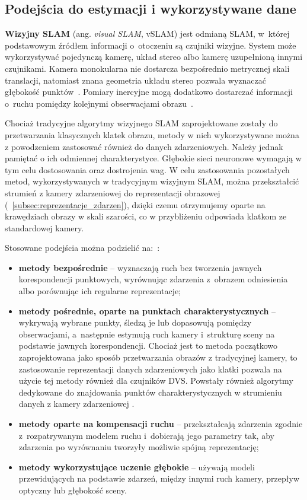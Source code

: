 \subsection{Podejścia do estymacji i wykorzystywane dane}
\label{subsec:podejscia_estymacja}

\textbf{Wizyjny SLAM} (ang. \textit{visual SLAM}, vSLAM) jest odmianą SLAM, w~której podstawowym źródłem informacji o~otoczeniu są czujniki wizyjne. System może wykorzystywać pojedynczą kamerę, układ stereo albo kamerę uzupełnioną innymi czujnikami. Kamera monokularna nie dostarcza bezpośrednio metrycznej skali translacji, natomiast znana geometria układu stereo pozwala wyznaczać głębokość punktów~\cite{hartley2004multiple}. Pomiary inercyjne mogą dodatkowo dostarczać informacji o~ruchu pomiędzy kolejnymi obserwacjami obrazu~\cite{forster2015preintegration}.

Chociaż tradycyjne algorytmy wizyjnego SLAM zaprojektowane zostały do przetwarzania klasycznych klatek obrazu, metody w nich wykorzystywane można z powodzeniem zastosować również do danych zdarzeniowych. Należy jednak pamiętać o ich odmiennej charakterystyce. Głębokie sieci neuronowe wymagają w tym celu dostosowania oraz dostrojenia wag. W celu zastosowania pozostałych metod, wykorzystywanych w tradycyjnym wizyjnym SLAM, można przekształcić strumień z kamery zdarzeniowej do reprezentacji obrazowej (~\ref{subsec:reprezentacje_zdarzen}), dzięki czemu otrzymujemy oparte na krawędziach obrazy w skali szarości, co w przybliżeniu odpowiada klatkom ze standardowej kamery.

Stosowane podejścia można podzielić na:~\cite{huang2026eventbased}:
\begin{itemize}
    \item \textbf{metody bezpośrednie} -- wyznaczają ruch bez tworzenia jawnych korespondencji punktowych, wyrównując zdarzenia z~obrazem odniesienia albo porównując ich regularne reprezentacje;
    \item \textbf{metody pośrednie, oparte na punktach charakterystycznych} -- wykrywają wybrane punkty, śledzą je lub dopasowują pomiędzy obserwacjami, a~następnie estymują ruch kamery i~strukturę sceny na podstawie jawnych korespondencji. Chociaż jest to metoda początkowo zaprojektowana jako sposób przetwarzania obrazów z tradycyjnej kamery, to zastosowanie reprezentacji danych zdarzeniowych jako klatki pozwala na użycie tej metody również dla czujników DVS. Powstały również algorytmy dedykowane do znajdowania punktów charakterystycznych w strumieniu danych z kamery zdarzeniowej \cite{vasco2016eharris}.
    \item \textbf{metody oparte na kompensacji ruchu} -- przekształcają zdarzenia zgodnie z~rozpatrywanym modelem ruchu i~dobierają jego parametry tak, aby zdarzenia po wyrównaniu tworzyły możliwie spójną reprezentację;
    \item \textbf{metody wykorzystujące uczenie głębokie} -- używają modeli przewidujących na podstawie zdarzeń, między innymi ruch kamery, przepływ optyczny lub głębokość sceny.
\end{itemize}

